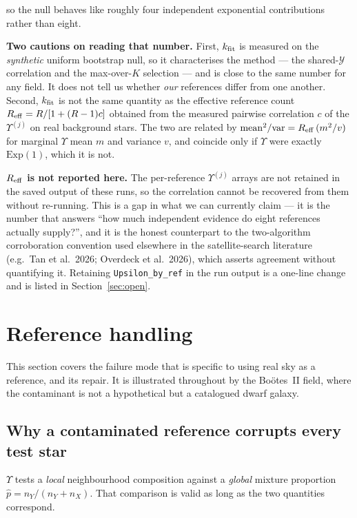\documentclass[11pt,a4paper]{article}
\newcommand{\Ycal}{\mathcal{Y}}              %
\newcommand{\Ups}{\Upsilon}                  %
\newcommand{\phat}{\hat{p}}                  %
\newcommand{\Ups}{\Upsilon}
\newcommand{\phat}{\hat{p}}
\newcommand{\Ycal}{\mathcal{Y}}
\begin{document}
so the null behaves like roughly four independent exponential contributions rather than eight.

\textbf{Two cautions on reading that number.} First, $k_{\rm fit}$ is measured on the
\emph{synthetic} uniform bootstrap null, so it characterises the method --- the shared-$\Ycal$
correlation and the max-over-$K$ selection --- and is close to the same number for any field. It
does not tell us whether \emph{our} references differ from one another. Second, $k_{\rm fit}$ is
not the same quantity as the effective reference count $R_{\rm eff} = R/[1 + (R-1)c]$ obtained from
the measured pairwise correlation $c$ of the $\Ups^{(j)}$ on real background stars. The two are
related by $\mathrm{mean}^2/\mathrm{var} = R_{\rm eff}\,(m^2/v)$ for marginal $\Ups$ mean $m$ and
variance $v$, and coincide only if $\Ups$ were exactly $\mathrm{Exp}(1)$, which it is not.

\textbf{$R_{\rm eff}$ is not reported here.} The per-reference $\Ups^{(j)}$ arrays are not retained
in the saved output of these runs, so the correlation cannot be recovered from them without
re-running. This is a gap in what we can currently claim --- it is the number that answers ``how
much independent evidence do eight references actually supply?'', and it is the honest counterpart
to the two-algorithm corroboration convention used elsewhere in the satellite-search literature
(e.g.\ Tan et al.\ 2026; Overdeck et al.\ 2026), which asserts agreement without quantifying it.
Retaining \texttt{Upsilon\_by\_ref} in the run output is a one-line change and is listed in
Section~\ref{sec:open}.

\section{Reference handling}
\label{sec:refhandling}

This section covers the failure mode that is specific to using real sky as a reference, and its
repair. It is illustrated throughout by the Bo\"otes~II field, where the contaminant is not a
hypothetical but a catalogued dwarf galaxy.

\subsection{Why a contaminated reference corrupts every test star}
\label{sec:pedestal}

$\Ups$ tests a \emph{local} neighbourhood composition against a \emph{global} mixture proportion
$\phat = n_Y/(n_Y + n_X)$. That comparison is valid as long as the two quantities correspond.
\end{document}
